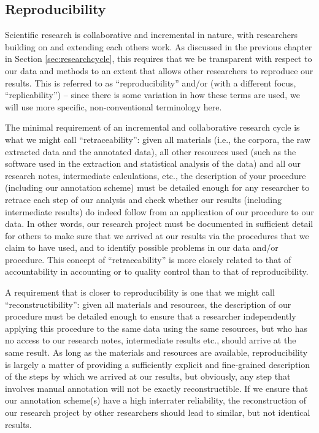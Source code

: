 \subsection{Reproducibility}
\label{sec:reproducibility}

Scientific research is collaborative and incremental in nature, with researchers building on and extending each others work. As discussed in the previous chapter in Section \ref{sec:researchcycle}, this requires that we be transparent with respect to our data and methods to an extent that allows other researchers to reproduce our results. This is referred to as ``reproducibility'' and/or (with a different focus, ``replicability'') -- since there is some variation in how these terms are used, we will use more specific, non\hyp{}conventional terminology here.

The minimal requirement of an incremental and collaborative research cycle is what we might call ``retraceability'': given all materials (i.e., the corpora, the raw extracted data and the annotated data), all other resources used (such as the software used in the extraction and statistical analysis of the data) and all our research notes, intermediate calculations, etc.,  the description of your procedure (including our annotation scheme) must be detailed enough for any researcher to retrace each step of our analysis and check whether our results (including intermediate results) do indeed follow from an application of our procedure to our data. In other words, our research project must be documented in sufficient detail for others to make sure that we arrived at our results via the procedures that we claim to have used, and to identify possible problems in our data and/or procedure. This concept of ``retraceability'' is more closely related to that of accountability in accounting or to quality control than to that of reproducibility. 

A requirement that is closer to reproducibility is one that we might call ``reconstructibility'': given all materials and resources, the description of our procedure must be detailed enough to ensure that a researcher independently applying this procedure to the same data using the same resources, but who has no access to our research notes, intermediate results etc., should arrive at the same result. As long as the materials and resources are available, reproducibility is largely a matter of providing a sufficiently explicit and fine-grained description of the steps by which we arrived at our results, but obviously, any step that involves manual annotation will not be exactly reconstructible. If we ensure that our annotation scheme(s) have a high interrater reliability, the reconstruction of our research project by other researchers should lead to similar, but not identical results. 

